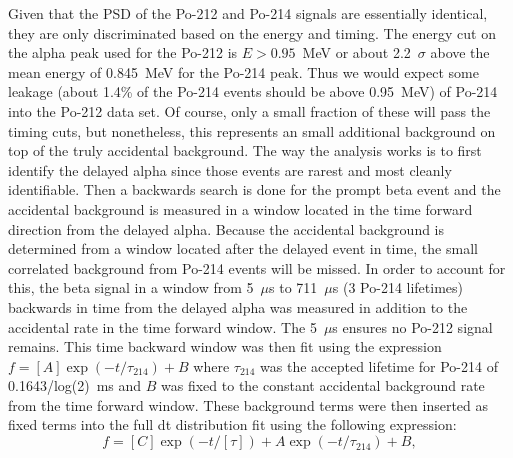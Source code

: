Given that the PSD of the Po-212 and Po-214 signals are essentially identical, they are only discriminated based on the energy and timing. The energy cut on the alpha peak used for the Po-212 is $E>0.95$~MeV or about 2.2~$\sigma$ above the mean energy of 0.845~MeV for the Po-214 peak. Thus we would expect some leakage (about 1.4\% of the Po-214 events should be above 0.95~MeV) of Po-214 into the Po-212 data set. Of course, only a small fraction of these will pass the timing cuts, but nonetheless, this represents an small additional background on top of the truly accidental background. The way the analysis works is to first identify the delayed alpha since those events are rarest and most cleanly identifiable. Then a backwards search is done for the prompt beta event and the accidental background is measured in a window located in the time forward direction from the delayed alpha. Because the accidental background is determined from a window located after the delayed event in time, the small correlated background from Po-214 events will be missed. In order to account for this, the beta signal in a window from 5~$\mu$s to 711~$\mu$s (3 Po-214 lifetimes) backwards in time from the delayed alpha  was measured in addition to the accidental rate in the time forward window. The 5~$\mu$s ensures no Po-212 signal remains. This time backward window was then fit using the expression $f=[A]\exp{(-t/\tau_{214})}+B$ where $\tau_{214}$ was the accepted lifetime for Po-214 of 0.1643/log(2)~ms and $B$ was fixed to the constant accidental background rate from the time forward window. These background terms were then inserted as fixed terms into the full dt distribution fit using the following expression:
\begin{equation}
f=[C]\exp{(-t/[\tau])}+A\exp{(-t/\tau_{214})}+B,
\label{eqn:fdecay}
\end{equation}
